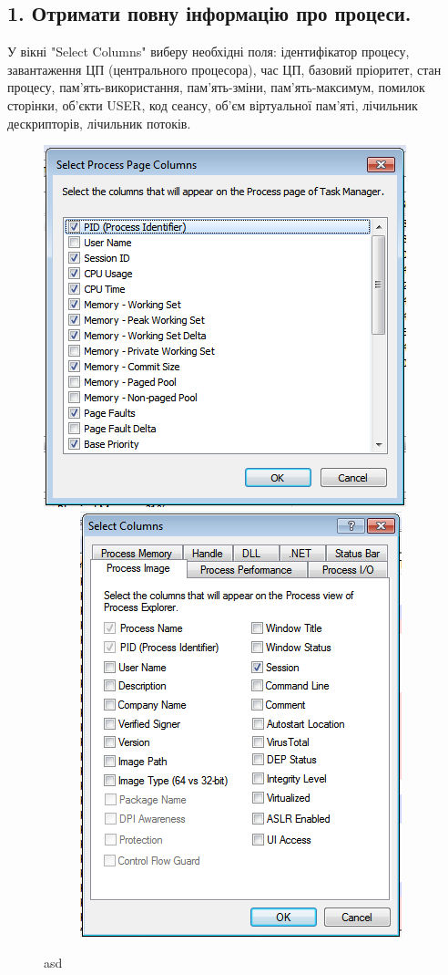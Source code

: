 \documentclass{article}
\begin{document}
\begin{normalsize}
	\subsection*{1. Отримати повну інформацію про процеси.}
	У вікні "Select Columns" виберу необхідні поля: ідентифікатор процесу, завантаження ЦП (центрального процесора), час ЦП, базовий пріоритет, стан процесу, пам'ять-використання, пам'ять-зміни, пам'ять-максимум, помилок сторінки, об’єкти USER, код сеансу, об’єм віртуальної пам’яті, лічильник дескрипторів, лічильник потоків.
	\begin{figure}[h]
		\centering
		\includegraphics[scale=0.42]{1}~~~~~
		\includegraphics[scale=0.42]{2}
		\caption{asd}
	\end{figure}


\end{normalsize}
\end{document}
